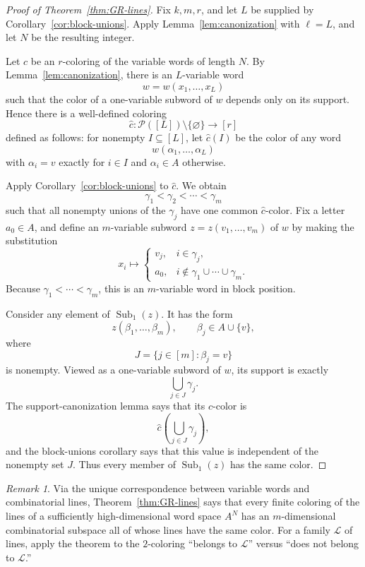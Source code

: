 \documentclass[11pt]{article}
\theoremstyle{remark}
\newtheorem{remark}[theorem]{Remark}
\newcommand{\cP}{\mathcal P}
\newcommand{\Sub}{\operatorname{Sub}}
\begin{document}
\begin{proof}[Proof of Theorem~\ref{thm:GR-lines}]
Fix $k,m,r$, and let $L$ be supplied by
Corollary~\ref{cor:block-unions}. Apply
Lemma~\ref{lem:canonization} with $\ell=L$, and let $N$ be the resulting
integer.

Let $c$ be an $r$-coloring of the variable words of length $N$. By
Lemma~\ref{lem:canonization}, there is an $L$-variable word
\[
  w=w(x_1,\dots,x_L)
\]
such that the color of a one-variable subword of $w$ depends only on its
support. Hence there is a well-defined coloring
\[
  \widehat c:\cP([L])\setminus\{\varnothing\}\longrightarrow[r]
\]
defined as follows: for nonempty $I\subseteq[L]$, let $\widehat c(I)$ be
the color of any word
\[
  w(\alpha_1,\dots,\alpha_L)
\]
with $\alpha_i=v$ exactly for $i\in I$ and $\alpha_i\in A$ otherwise.

Apply Corollary~\ref{cor:block-unions} to $\widehat c$. We obtain
\[
  \gamma_1<\gamma_2<\cdots<\gamma_m
\]
such that all nonempty unions of the $\gamma_j$ have one common
$\widehat c$-color. Fix a letter $a_0\in A$, and define an $m$-variable
subword $z=z(v_1,\dots,v_m)$ of $w$ by making the substitution
\[
  x_i\longmapsto
  \begin{cases}
    v_j,& i\in\gamma_j,\\
    a_0,& i\notin\gamma_1\cup\cdots\cup\gamma_m.
  \end{cases}
\]
Because $\gamma_1<\cdots<\gamma_m$, this is an $m$-variable word in block
position.

Consider any element of $\Sub_1(z)$. It has the form
\[
  z(\beta_1,\dots,\beta_m),
  \qquad \beta_j\in A\cup\{v\},
\]
where
\[
  J=\{j\in[m]:\beta_j=v\}
\]
is nonempty. Viewed as a one-variable subword of $w$, its support is
exactly
\[
  \bigcup_{j\in J}\gamma_j.
\]
The support-canonization lemma says that its $c$-color is
\[
  \widehat c\left(\bigcup_{j\in J}\gamma_j\right),
\]
and the block-unions corollary says that this value is independent of the
nonempty set $J$. Thus every member of $\Sub_1(z)$ has the same color.
\end{proof}

\begin{remark}
Via the unique correspondence between variable words and combinatorial
lines, Theorem~\ref{thm:GR-lines} says that every finite coloring of the
lines of a sufficiently high-dimensional word space $A^N$ has an
$m$-dimensional combinatorial subspace all of whose lines have the same
color. For a family $\mathcal L$ of lines, apply the theorem to the
$2$-coloring ``belongs to $\mathcal L$'' versus ``does not belong to
$\mathcal L$.''
\end{remark}
\end{document}
